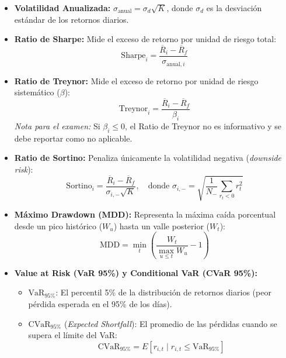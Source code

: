 \documentclass[11pt,a4paper]{article}
\begin{document}
\begin{itemize}
    \item \textbf{Volatilidad Anualizada:} $\sigma_{\text{anual}} = \sigma_d \sqrt{K}$, donde $\sigma_d$ es la desviación estándar de los retornos diarios.
    \item \textbf{Ratio de Sharpe:} Mide el exceso de retorno por unidad de riesgo total:
    \begin{equation}
    \text{Sharpe}_i = \frac{\overline{R}_i - \overline{R}_f}{\sigma_{\text{anual}, i}}
    \end{equation}
    \item \textbf{Ratio de Treynor:} Mide el exceso de retorno por unidad de riesgo sistemático ($\beta$):
    \begin{equation}
    \text{Treynor}_i = \frac{\overline{R}_i - \overline{R}_f}{\beta_i}
    \end{equation}
    \textit{Nota para el examen:} Si $\beta_i \le 0$, el Ratio de Treynor no es informativo y se debe reportar como no aplicable.
    \item \textbf{Ratio de Sortino:} Penaliza únicamente la volatilidad negativa (\textit{downside risk}):
    \begin{equation}
    \text{Sortino}_i = \frac{\overline{R}_i - \overline{R}_f}{\sigma_{i,-} \sqrt{K}}, \quad \text{donde } \sigma_{i,-} = \sqrt{\frac{1}{N_-} \sum_{r_t < 0} r_t^2}
    \end{equation}
    \item \textbf{Máximo Drawdown (MDD):} Representa la máxima caída porcentual desde un pico histórico ($W_u$) hasta un valle posterior ($W_t$):
    \begin{equation}
    \text{MDD} = \min_{t} \left( \frac{W_t}{\max_{u \le t} W_u} - 1 \right)
    \end{equation}
    \item \textbf{Value at Risk (VaR 95\%) y Conditional VaR (CVaR 95\%):}
    \begin{itemize}
        \item $\text{VaR}_{95\%}$: El percentil 5\% de la distribución de retornos diarios (peor pérdida esperada en el 95\% de los días).
        \item $\text{CVaR}_{95\%}$ (\textit{Expected Shortfall}): El promedio de las pérdidas cuando se supera el límite del VaR:
        \begin{equation}
        \text{CVaR}_{95\%} = E \left[ r_{i,t} \mid r_{i,t} \le \text{VaR}_{95\%} \right]
        \end{equation}
    \end{itemize}
\end{itemize}
\end{document}
